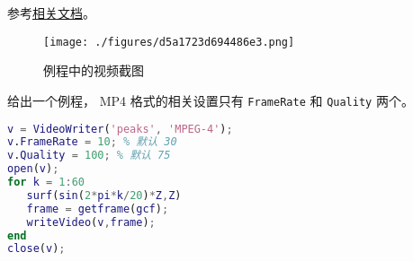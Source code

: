 
\begin{issues}
\issueDraft
\end{issues}


参考\href{https://www.mathworks.com/help/matlab/ref/videowriter.html}{相关文档}。

\begin{figure}[ht]
\centering
\texttt{[image: ./figures/d5a1723d694486e3.png]}
\caption{例程中的视频截图} \label{fig_MatMp4_1}
\end{figure}


给出一个例程， MP4 格式的相关设置只有 \verb|FrameRate| 和 \verb|Quality| 两个。
\begin{lstlisting}[language=matlab, caption=mp4\_demo.m]
% 写 mp4 视频
v = VideoWriter('peaks', 'MPEG-4');
v.FrameRate = 10; % 默认 30
v.Quality = 100; % 默认 75
open(v);
for k = 1:60 
   surf(sin(2*pi*k/20)*Z,Z)
   frame = getframe(gcf);
   writeVideo(v,frame);
end
close(v);
\end{lstlisting}
